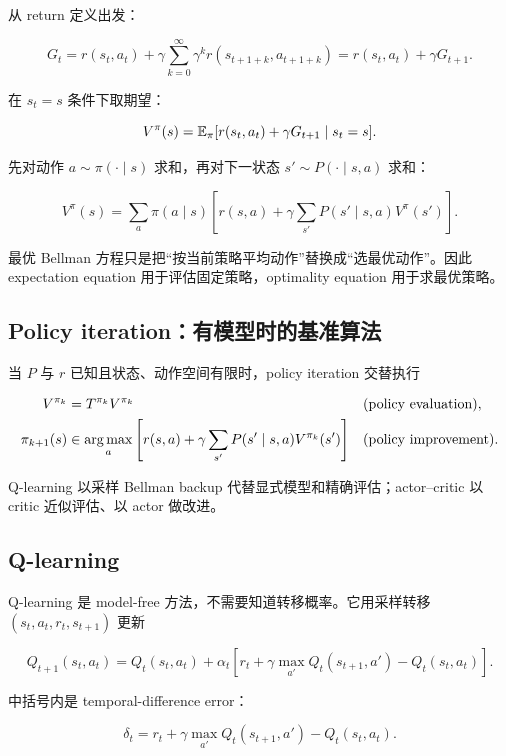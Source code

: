 \documentclass[11pt]{ctexart}
\begin{document}
从 return 定义出发：

\[
  G_t
  =
  r(s_t,a_t)
  +
  \gamma
  \sum_{k=0}^{\infty}\gamma^k r(s_{t+1+k},a_{t+1+k})
  =
  r(s_t,a_t)+\gamma G_{t+1}.
\]

在 \(s_t=s\) 条件下取期望：

\[
  V^\pi(s)
  =
  \mathbb{E}_\pi[r(s_t,a_t)+\gamma G_{t+1}\mid s_t=s].
\]

先对动作 \(a\sim\pi(\cdot\mid s)\) 求和，再对下一状态 \(s'\sim P(\cdot\mid s,a)\) 求和：

\[
  V^\pi(s)
  =
  \sum_a\pi(a\mid s)
  \left[
    r(s,a)
    +
    \gamma\sum_{s'}P(s'\mid s,a)V^\pi(s')
  \right].
\]

最优 Bellman 方程只是把“按当前策略平均动作”替换成“选最优动作”。因此 expectation equation 用于评估固定策略，optimality equation 用于求最优策略。

\subsection{Policy iteration：有模型时的基准算法}

当 \(P\) 与 \(r\) 已知且状态、动作空间有限时，policy iteration 交替执行

\[
  \begin{aligned}
    V^{\pi_k}&=T^{\pi_k}V^{\pi_k}
      &&\text{(policy evaluation)},\\
    \pi_{k+1}(s)&\in\operatorname*{arg\,max}_a
      \left[r(s,a)+\gamma\sum_{s'}P(s'\mid s,a)V^{\pi_k}(s')\right]
      &&\text{(policy improvement)}.
  \end{aligned}
\]

Q-learning 以采样 Bellman backup 代替显式模型和精确评估；actor--critic 以 critic 近似评估、以 actor 做改进。

\subsection{Q-learning}


Q-learning 是 model-free 方法，不需要知道转移概率。它用采样转移 \((s_t,a_t,r_t,s_{t+1})\) 更新

\[
  Q_{t+1}(s_t,a_t)
  =
  Q_t(s_t,a_t)
  +
  \alpha_t
  \left[
    r_t
    +
    \gamma\max_{a'}Q_t(s_{t+1},a')
    -
    Q_t(s_t,a_t)
  \right].
\]

中括号内是 temporal-difference error：

\[
  \delta_t
  =
  r_t
  +
  \gamma\max_{a'}Q_t(s_{t+1},a')
  -
  Q_t(s_t,a_t).
\]
\end{document}
